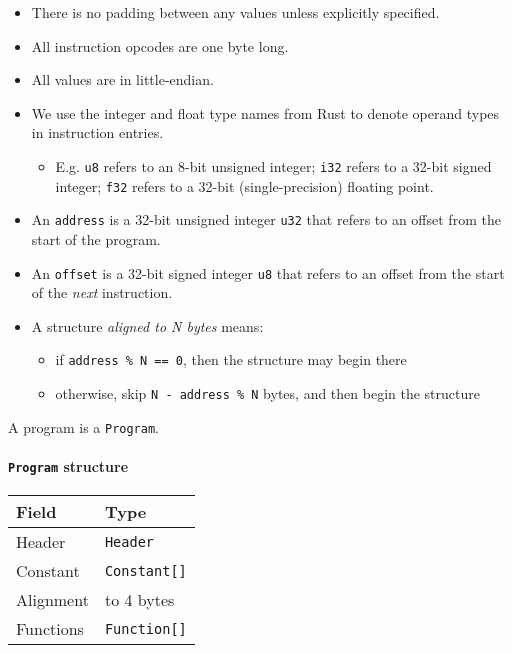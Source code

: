 \begin{itemize}
\item
  There is no padding between any values unless explicitly specified.
\item
  All instruction opcodes are one byte long.
\item
  All values are in little-endian.
\item
  We use the integer and float type names from Rust to denote operand
  types in instruction entries.

  \begin{itemize}
    \item
    E.g. \texttt{u8} refers to an 8-bit unsigned integer; \texttt{i32}
    refers to a 32-bit signed integer; \texttt{f32} refers to a 32-bit
    (single-precision) floating point.
  \end{itemize}
\item
  An \texttt{address} is a 32-bit unsigned integer \texttt{u32} that
  refers to an offset from the start of the program.
\item
  An \texttt{offset} is a 32-bit signed integer \texttt{u8} that refers
  to an offset from the start of the \emph{next} instruction.
\item
  A structure \emph{aligned to N bytes} means:

  \begin{itemize}
    \item
    if \texttt{address\ \%\ N\ ==\ 0}, then the structure may begin
    there
  \item
    otherwise, skip \texttt{N\ -\ address\ \%\ N} bytes, and then begin
    the structure
  \end{itemize}
\end{itemize}

A program is a \texttt{Program}.

\paragraph{\texorpdfstring{\texttt{Program}
structure}{Program structure}}

\begin{tabular}{ll}
\toprule
Field & Type\tabularnewline
\midrule
Header & \texttt{Header}\tabularnewline
Constant & \texttt{Constant{[}{]}}\tabularnewline
Alignment & to 4 bytes\tabularnewline
Functions & \texttt{Function{[}{]}}\tabularnewline
\bottomrule
\end{tabular}

\medskip

